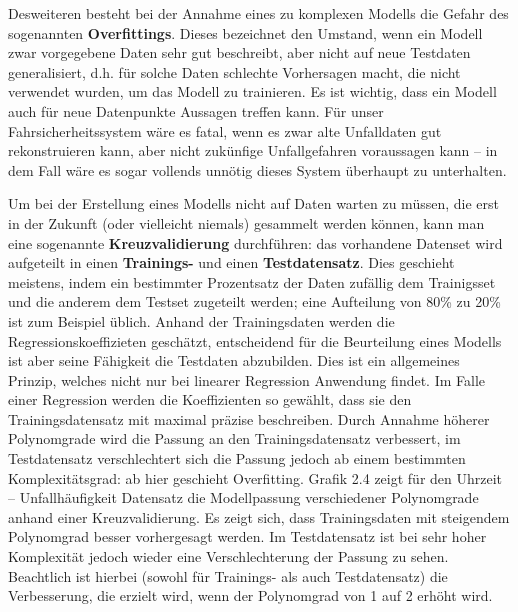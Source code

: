 Desweiteren besteht bei der Annahme eines zu komplexen Modells die Gefahr des
sogenannten \textbf{Overfittings}. Dieses bezeichnet den Umstand, wenn ein Modell
zwar vorgegebene Daten sehr gut beschreibt, aber nicht auf neue Testdaten
generalisiert, d.h. für solche Daten schlechte Vorhersagen macht, die nicht verwendet
wurden, um das Modell zu trainieren. Es ist wichtig, dass ein Modell auch für neue
Datenpunkte Aussagen treffen kann. Für unser Fahrsicherheitssystem wäre es fatal,
wenn es zwar alte Unfalldaten gut rekonstruieren kann, aber nicht zukünfige
Unfallgefahren voraussagen kann -- in dem Fall wäre es sogar vollends unnötig dieses
System überhaupt zu unterhalten.

Um bei der Erstellung eines Modells nicht auf Daten warten zu müssen, die erst in der
Zukunft (oder vielleicht niemals) gesammelt werden können, kann man eine sogenannte
\textbf{Kreuzvalidierung} durchführen: das vorhandene Datenset wird aufgeteilt in
einen \textbf{Trainings-} und einen \textbf{Testdatensatz}. Dies geschieht meistens,
indem ein bestimmter Prozentsatz der Daten zufällig dem Trainigsset und die anderem
dem Testset zugeteilt werden; eine Aufteilung von 80\% zu 20\% ist zum Beispiel
üblich. Anhand der Trainingsdaten werden die Regressionskoeffizieten geschätzt,
entscheidend für die Beurteilung eines Modells ist aber seine Fähigkeit die Testdaten
abzubilden. Dies ist ein allgemeines Prinzip, welches nicht nur bei linearer
Regression Anwendung findet. Im Falle einer Regression werden die Koeffizienten so
gewählt, dass sie den Trainingsdatensatz mit maximal präzise beschreiben. Durch
Annahme höherer Polynomgrade wird die Passung an den Trainingsdatensatz verbessert,
im Testdatensatz verschlechtert sich die Passung jedoch ab einem bestimmten
Komplexitätsgrad: ab hier geschieht Overfitting. Grafik 2.4 zeigt für den Uhrzeit --
Unfallhäufigkeit Datensatz die Modellpassung verschiedener Polynomgrade anhand einer
Kreuzvalidierung. Es zeigt sich, dass Trainingsdaten mit steigendem Polynomgrad
besser vorhergesagt werden. Im Testdatensatz ist bei sehr hoher Komplexität jedoch
wieder eine Verschlechterung der Passung zu sehen. Beachtlich ist hierbei (sowohl für
Trainings- als auch Testdatensatz) die Verbesserung, die erzielt wird, wenn der
Polynomgrad von 1 auf 2 erhöht wird.

